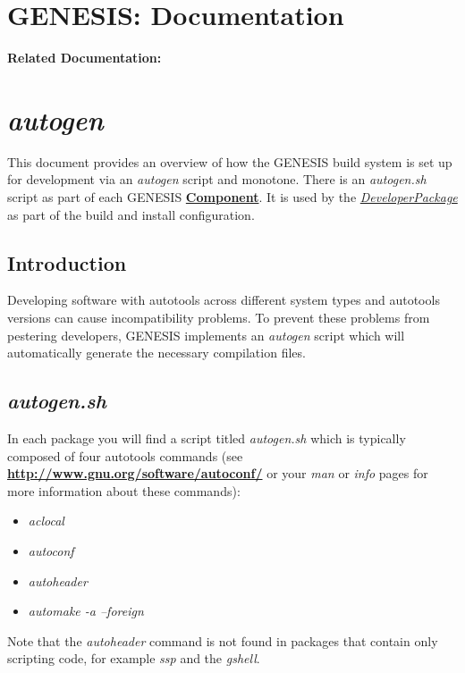 \documentclass[12pt]{article}
\begin{document}
\section*{GENESIS: Documentation}

{\bf Related Documentation:}

\section*{\it autogen}

This document provides an overview of how the GENESIS build system is set up for development via an {\it autogen} script and monotone. There is an {\it autogen.sh} script as part of each GENESIS \href{../reserved-words/reserved-words.tex}{\bf Component}. It is used by the \href{../developer-package/developer-package.tex}{\it DeveloperPackage} as part of the build and install configuration.

\subsection*{Introduction}

Developing software with autotools across different system types and autotools versions can cause incompatibility problems. To prevent these problems from pestering developers, GENESIS implements an {\it autogen} script which will automatically generate the necessary compilation files.

\subsection*{\it autogen.sh}

In each package you will find a script titled {\it autogen.sh} which is typically composed of four autotools commands (see \href{http://www.gnu.org/software/autoconf/}{\bf http://www.gnu.org/software/autoconf/} or your {\it man} or {\it info} pages for more information about these commands):
\begin{itemize}
	\item {\it aclocal}
	\item {\it autoconf}
	\item {\it autoheader}
	\item {\it automake -a --foreign}
\end{itemize}
Note that the {\it autoheader} command is not found in packages that contain only scripting code, for example {\it ssp} and the {\it gshell}.
\end{document}
